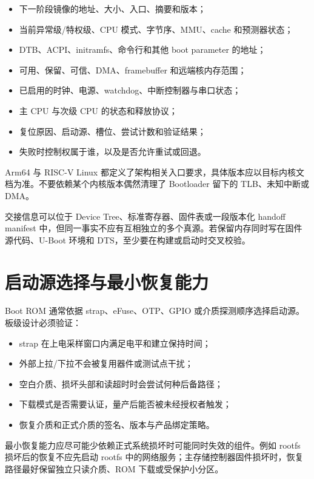 \begin{itemize}
  \item 下一阶段镜像的地址、大小、入口、摘要和版本；
  \item 当前异常级/特权级、CPU 模式、字节序、MMU、cache 和预测器状态；
  \item DTB、ACPI、initramfs、命令行和其他 boot parameter 的地址；
  \item 可用、保留、可信、DMA、framebuffer 和远端核内存范围；
  \item 已启用的时钟、电源、watchdog、中断控制器与串口状态；
  \item 主 CPU 与次级 CPU 的状态和释放协议；
  \item 复位原因、启动源、槽位、尝试计数和验证结果；
  \item 失败时控制权属于谁，以及是否允许重试或回退。
\end{itemize}

Arm64 与 RISC-V Linux 都定义了架构相关入口要求，具体版本应以目标内核文档为准\cite{linux-arm64-booting,linux-riscv-booting}。不要依赖某个内核版本偶然清理了 Bootloader 留下的 TLB、未知中断或 DMA。

交接信息可以位于 Device Tree、标准寄存器、固件表或一段版本化 handoff manifest 中，但同一事实不应有互相独立的多个真源。若保留内存同时写在固件源代码、U-Boot 环境和 DTS，至少要在构建或启动时交叉校验。

\section{启动源选择与最小恢复能力}

Boot ROM 通常依据 strap、eFuse、OTP、GPIO 或介质探测顺序选择启动源。板级设计必须验证：

\begin{itemize}
  \item strap 在上电采样窗口内满足电平和建立保持时间；
  \item 外部上拉/下拉不会被复用器件或测试点干扰；
  \item 空白介质、损坏头部和读超时时会尝试何种后备路径；
  \item 下载模式是否需要认证，量产后能否被未经授权者触发；
  \item 恢复介质和正式介质的签名、版本与产品绑定策略。
\end{itemize}

最小恢复能力应尽可能少依赖正式系统损坏时可能同时失效的组件。例如 rootfs 损坏后的恢复不应先启动 rootfs 中的网络服务；主存储控制器固件损坏时，恢复路径最好保留独立只读介质、ROM 下载或受保护小分区。


